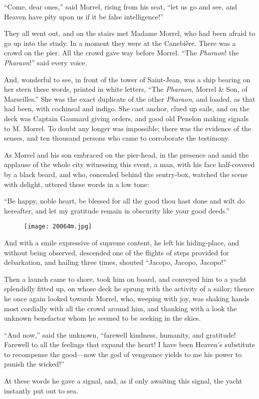 “Come, dear ones,” said Morrel, rising from his seat, “let us go and
see, and Heaven have pity upon us if it be false intelligence!”

They all went out, and on the stairs met Madame Morrel, who had been
afraid to go up into the study. In a moment they were at the Canebière.
There was a crowd on the pier. All the crowd gave way before Morrel.
“The \textit{Pharaon}! the \textit{Pharaon}!” said every voice.

And, wonderful to see, in front of the tower of Saint-Jean, was a ship
bearing on her stern these words, printed in white letters, “The
\textit{Pharaon}, Morrel \& Son, of Marseilles.” She was the exact duplicate of
the other \textit{Pharaon}, and loaded, as that had been, with cochineal and
indigo. She cast anchor, clued up sails, and on the deck was Captain
Gaumard giving orders, and good old Penelon making signals to M.
Morrel. To doubt any longer was impossible; there was the evidence of
the senses, and ten thousand persons who came to corroborate the
testimony.

As Morrel and his son embraced on the pier-head, in the presence and
amid the applause of the whole city witnessing this event, a man, with
his face half-covered by a black beard, and who, concealed behind the
sentry-box, watched the scene with delight, uttered these words in a
low tone:

“Be happy, noble heart, be blessed for all the good thou hast done and
wilt do hereafter, and let my gratitude remain in obscurity like your
good deeds.”

\begin{figure}[ht]
\texttt{[image: 20064m.jpg]}
\end{figure}

And with a smile expressive of supreme content, he left his
hiding-place, and without being observed, descended one of the flights
of steps provided for debarkation, and hailing three times, shouted
“Jacopo, Jacopo, Jacopo!”

Then a launch came to shore, took him on board, and conveyed him to a
yacht splendidly fitted up, on whose deck he sprung with the activity
of a sailor; thence he once again looked towards Morrel, who, weeping
with joy, was shaking hands most cordially with all the crowd around
him, and thanking with a look the unknown benefactor whom he seemed to
be seeking in the skies.

“And now,” said the unknown, “farewell kindness, humanity, and
gratitude! Farewell to all the feelings that expand the heart! I have
been Heaven’s substitute to recompense the good—now the god of
vengeance yields to me his power to punish the wicked!”

At these words he gave a signal, and, as if only awaiting this signal,
the yacht instantly put out to sea.
